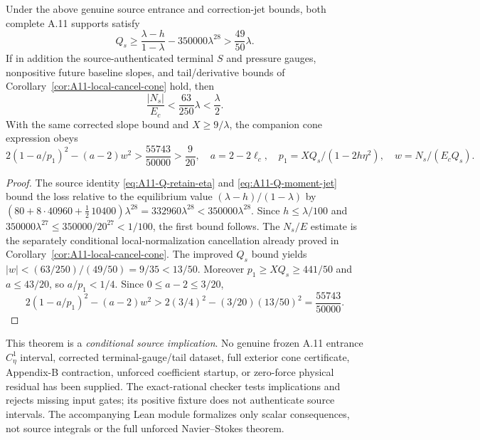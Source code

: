 \begin{theorem}
\label{thm:A11-Q-eta-improved}
Under the above genuine source entrance and correction-jet bounds,
both complete A.11 supports satisfy
\begin{equation}\label{eq:A11-Q-improved}
Q_s\ge\frac{\lambda-h}{1-\lambda}
-350000\lambda^{28}>\frac{49}{50}\lambda.
\end{equation}
If in addition the source-authenticated terminal $S$ and pressure
gauges, nonpositive future baseline slopes, and tail/derivative
bounds of Corollary~\ref{cor:A11-local-cancel-cone} hold, then
\[
\frac{|N_s|}{E_c}<\frac{63}{250}\lambda<\frac\lambda2.
\]
With the same corrected slope bound and $X\ge9/\lambda$, the
companion cone expression obeys
\[
2(1-a/p_1)^2-(a-2)w^2>
\frac{55743}{50000}>\frac9{20},
\quad a=2-2\ell_c,\quad p_1=XQ_s/(1-2h\eta^2),
\quad w=N_s/(E_cQ_s).
\]
\end{theorem}
\begin{proof}
The source identity \eqref{eq:A11-Q-retain-eta} and
\eqref{eq:A11-Q-moment-jet} bound the loss relative to the
equilibrium value $(\lambda-h)/(1-\lambda)$ by
$(80+8\cdot40960+\frac12\,10400)\lambda^{28}
=332960\lambda^{28}<350000\lambda^{28}$.
Since $h\le\lambda/100$ and
$350000\lambda^{27}\le350000/20^{27}<1/100$,
the first bound follows. The $N_s/E$ estimate is the
separately conditional local-normalization cancellation already
proved in Corollary~\ref{cor:A11-local-cancel-cone}.
The improved $Q_s$ bound yields
$|w|<(63/250)/(49/50)=9/35<13/50$.
Moreover $p_1\ge XQ_s\ge441/50$ and
$a\le43/20$, so $a/p_1<1/4$.
Since $0\le a-2\le3/20$,
\[
2(1-a/p_1)^2-(a-2)w^2
> 2(3/4)^2-(3/20)(13/50)^2
=\frac{55743}{50000}.
\]
\end{proof}
This theorem is a \emph{conditional source implication}.
No genuine frozen A.11 entrance $C_\eta^1$ interval, corrected
terminal-gauge/tail dataset, full exterior cone certificate,
Appendix-B contraction, unforced coefficient startup, or
zero-force physical residual has been supplied. The exact-rational
checker tests implications and rejects missing input gates;
its positive fixture does not authenticate source intervals.
The accompanying Lean module formalizes only scalar consequences,
not source integrals or the full unforced Navier--Stokes theorem.